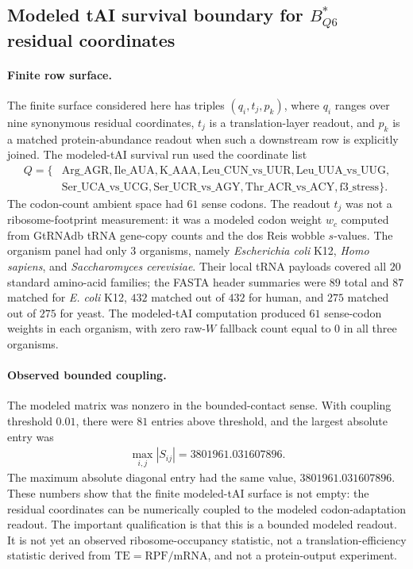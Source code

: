 
\subsection{Modeled tAI survival boundary for $B^*_{Q6}$ residual coordinates}
\label{subsec:bioreality-bstar-q6-modeled-tai-survival-boundary}

\paragraph{Finite row surface.}
The finite surface considered here has triples $(q_i,t_j,p_k)$, where $q_i$ ranges over nine synonymous residual coordinates, $t_j$ is a translation-layer readout, and $p_k$ is a matched protein-abundance readout when such a downstream row is explicitly joined.  The modeled-tAI survival run used the coordinate list
$$
\begin{aligned}
Q = \{&\mathrm{Arg\_AGR},\mathrm{Ile\_AUA},\mathrm{K\_AAA},\mathrm{Leu\_CUN\_vs\_UUR},\mathrm{Leu\_UUA\_vs\_UUG},\\
&\mathrm{Ser\_UCA\_vs\_UCG},\mathrm{Ser\_UCR\_vs\_AGY},\mathrm{Thr\_ACR\_vs\_ACY},\mathrm{f3\_stress}\}.
\end{aligned}
$$
The codon-count ambient space had $61$ sense codons.  The readout $t_j$ was not a ribosome-footprint measurement: it was a modeled codon weight $w_c$ computed from GtRNAdb tRNA gene-copy counts and the dos Reis wobble $s$-values.  The organism panel had only $3$ organisms, namely \textit{Escherichia coli} K12, \textit{Homo sapiens}, and \textit{Saccharomyces cerevisiae}.  Their local tRNA payloads covered all $20$ standard amino-acid families; the FASTA header summaries were $89$ total and $87$ matched for \textit{E. coli} K12, $432$ matched out of $432$ for human, and $275$ matched out of $275$ for yeast.  The modeled-tAI computation produced $61$ sense-codon weights in each organism, with zero raw-$W$ fallback count equal to $0$ in all three organisms.

\paragraph{Observed bounded coupling.}
The modeled matrix was nonzero in the bounded-contact sense.  With coupling threshold $0.01$, there were $81$ entries above threshold, and the largest absolute entry was
$$
\begin{aligned}
\max_{i,j} |S_{ij}| = 3801961.031607896.
\end{aligned}
$$
The maximum absolute diagonal entry had the same value, $3801961.031607896$.  These numbers show that the finite modeled-tAI surface is not empty: the residual coordinates can be numerically coupled to the modeled codon-adaptation readout.  The important qualification is that this is a bounded modeled readout.  It is not yet an observed ribosome-occupancy statistic, not a translation-efficiency statistic derived from $\mathrm{TE}=\mathrm{RPF}/\mathrm{mRNA}$, and not a protein-output experiment.

